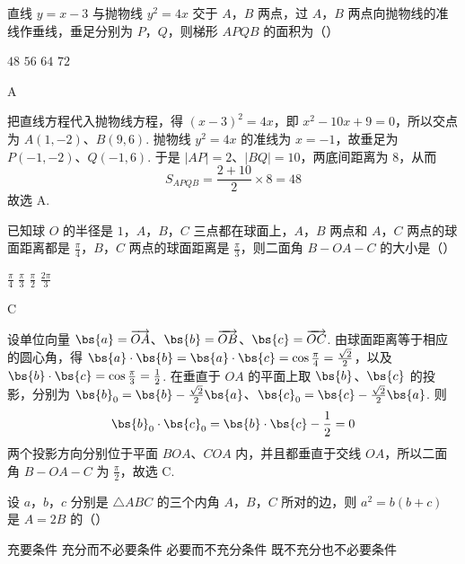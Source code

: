 \begin{problem}
直线 \( y = x - 3 \) 与抛物线 \( y^{2} = 4x \) 交于 \(A\)，\(B\) 两点，过 \(A\)，\(B\) 两点向抛物线的准线作垂线，垂足分别为 \(P\)，\(Q\)，则梯形 \(APQB\) 的面积为（\quad）

\choices
    {\(48\)}
    {\(56\)}
    {\(64\)}
    {\(72\)}
\end{problem}

\begin{answer}
A
\end{answer}

\begin{solution}
把直线方程代入抛物线方程，得 \((x-3)^2=4x\)，即 \(x^2-10x+9=0\)，所以交点为 \(A(1,-2)\)、\(B(9,6)\). 抛物线 \(y^2=4x\) 的准线为 \(x=-1\)，故垂足为 \(P(-1,-2)\)、\(Q(-1,6)\). 于是 \(|AP|=2\)、\(|BQ|=10\)，两底间距离为 \(8\)，从而
\[
S_{APQB}=\frac{2+10}{2}\times8=48
\]
故选 A.
\end{solution}

\begin{problem}
已知球 \(O\) 的半径是 \(1\)，\(A\)，\(B\)，\(C\) 三点都在球面上，\(A\)，\(B\) 两点和 \(A\)，\(C\) 两点的球面距离都是 \(\frac{\pi}{4}\)，\(B\)，\(C\) 两点的球面距离是 \(\frac{\pi}{3}\)，则二面角 \(B-OA-C\) 的大小是（\quad）

\choices
    {\( \frac{\pi}{4} \)}
    {\( \frac{\pi}{3} \)}
    {\( \frac{\pi}{2} \)}
    {\( \frac{2\pi}{3} \)}
\end{problem}

\begin{answer}
C
\end{answer}

\begin{solution}
设单位向量 \(\bs{a}=\overrightarrow{OA}\)、\(\bs{b}=\overrightarrow{OB}\)、\(\bs{c}=\overrightarrow{OC}\). 由球面距离等于相应的圆心角，得 \(\bs{a}\cdot\bs{b}=\bs{a}\cdot\bs{c}=\cos\frac{\pi}{4}=\frac{\sqrt{2}}{2}\)，以及 \(\bs{b}\cdot\bs{c}=\cos\frac{\pi}{3}=\frac12\). 在垂直于 \(OA\) 的平面上取 \(\bs{b}\)、\(\bs{c}\) 的投影，分别为 \(\bs{b}_0=\bs{b}-\frac{\sqrt2}{2}\bs{a}\)、\(\bs{c}_0=\bs{c}-\frac{\sqrt2}{2}\bs{a}\). 则
\[
\bs{b}_0\cdot\bs{c}_0=\bs{b}\cdot\bs{c}-\frac12=0
\]
两个投影方向分别位于平面 \(BOA\)、\(COA\) 内，并且都垂直于交线 \(OA\)，所以二面角 \(B-OA-C\) 为 \(\frac{\pi}{2}\)，故选 C.
\end{solution}

\begin{problem}
设 \(a\)，\(b\)，\(c\) 分别是 \(\triangle ABC\) 的三个内角 \(A\)，\(B\)，\(C\) 所对的边，则 \(a^{2}=b(b+c)\) 是 \(A=2B\) 的（\quad）

\choices
    {充要条件}
    {充分而不必要条件}
    {必要而不充分条件}
    {既不充分也不必要条件}
\end{problem}

